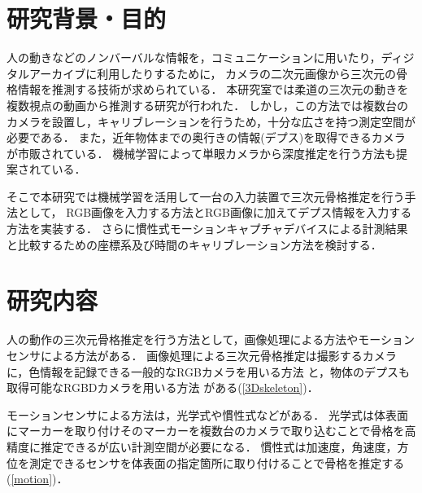 \documentclass[titlepage]{jarticle}
\begin{document}
\maketitle

\section{研究背景・目的}
人の動きなどのノンバーバルな情報を，コミュニケーションに用いたり，ディジタルアーカイブに利用したりするために，
カメラの二次元画像から三次元の骨格情報を推測する技術が求められている．
本研究室では柔道の三次元の動きを複数視点の動画から推測する研究\cite{turugi}が行われた．
しかし，この方法では複数台のカメラを設置し，キャリブレーションを行うため，十分な広さを持つ測定空間が必要である．
また，近年物体までの奥行きの情報(デプス)を取得できるカメラが市販されている．
機械学習によって単眼カメラから深度推定を行う方法も提案されている\cite{depth}．

そこで本研究では機械学習を活用して一台の入力装置で三次元骨格推定を行う手法として，
RGB画像を入力する方法とRGB画像に加えてデプス情報を入力する方法を実装する．
さらに慣性式モーションキャプチャデバイスによる計測結果と比較するための座標系及び時間のキャリブレーション方法を検討する．
\section{研究内容}
%
人の動作の三次元骨格推定を行う方法として，画像処理による方法やモーションセンサによる方法がある．%
画像処理による三次元骨格推定は撮影するカメラに，色情報を記録できる一般的なRGBカメラを用いる方法
と，物体のデプスも取得可能なRGBDカメラを用いる方法
がある(\ref{3Dskeleton})．

モーションセンサによる方法は，光学式や慣性式などがある．
光学式は体表面にマーカーを取り付けそのマーカーを複数台のカメラで取り込むことで骨格を高精度に推定できるが広い計測空間が必要になる．
慣性式は加速度，角速度，方位を測定できるセンサを体表面の指定箇所に取り付けることで骨格を推定する(\ref{motion})．

\end{document}
